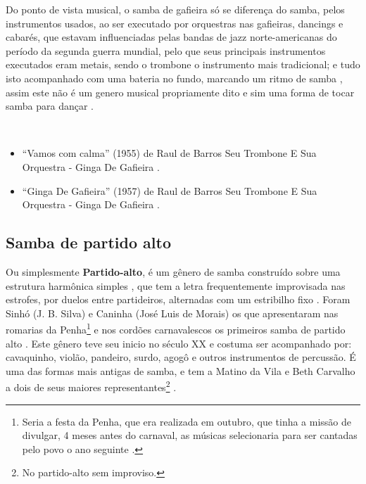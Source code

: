 Do ponto de vista musical, o samba de gafieira só se diferença do samba, 
pelos instrumentos usados, ao ser executado por orquestras nas gafieiras, dancings e cabarés,
que estavam influenciadas pelas bandas de jazz norte-americanas do período da segunda guerra mundial,
pelo que seus principais instrumentos executados eram metais, 
sendo o trombone o instrumento mais tradicional;
e tudo isto acompanhado com uma bateria no fundo, 
marcando um ritmo de samba \cite[pp. 131]{perna2002samba} \cite[pp. 685]{marcondes1977enciclopediav2},
assim este não é um genero musical propriamente dito e sim uma forma de tocar samba para dançar \cite[pp. 685]{marcondes1977enciclopediav2}.


\begin{example} ~

\begin{itemize}
\item ``Vamos com calma'' (1955) de  Raul de Barros Seu Trombone E Sua Orquestra - Ginga De Gafieira \cite{RaulDeBarrosMusic1}.
\item ``Ginga De Gafieira'' (1957) de  Raul de Barros Seu Trombone E Sua Orquestra - Ginga De Gafieira \cite{RaulDeBarrosMusic2}.
\end{itemize}
\end{example}

\subsection{Samba de partido alto}
Ou simplesmente \textbf{Partido-alto}, 
é um gênero de samba construído sobre uma estrutura harmônica simples \cite[pp. 291]{dourado2004dicionario}, 
que tem a letra frequentemente improvisada  nas estrofes, por duelos entre partideiros, alternadas com um estribilho fixo \cite[128]{perna2002samba} \cite[pp. 291]{dourado2004dicionario}.
Foram Sinhó (J. B. Silva) e Caninha (José Luis de Morais) os
que apresentaram nas romarias da Penha\footnote{Seria 
a festa da Penha, que era realizada em outubro, que tinha a missão
de divulgar, 4 meses antes do carnaval, 
as músicas selecionaria para ser cantadas
 pelo povo o ano seguinte \cite[Cad. B pp. 4]{jornalsambaderoda5}.} e nos cordões carnavalescos os primeiros samba de partido alto \cite[pp. 4]{musicasambavariasdef1}. 
Este gênero teve seu inicio no século XX e costuma ser acompanhado por: 
cavaquinho, violão, pandeiro, surdo, agogô e outros instrumentos de percussão.
É uma das formas mais antigas de samba, 
e tem a Matino da Vila e Beth Carvalho a dois de seus maiores representantes\footnote{No partido-alto sem improviso.} \cite[pp. 291]{dourado2004dicionario} \cite[pp. 212]{diniz2006almanaque}. 

